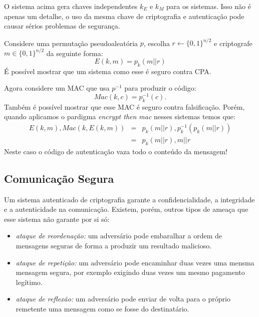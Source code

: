 O sistema acima gera chaves independentes $k_E$ e $k_M$ para os sistemas.
Isso não é apenas um detalhe, o uso da mesma chave de criptografia e autenticação pode causar sérios problemas de segurança.


\begin{example}
  Considere uma permutação pseudoaleatória $p$, escolha $r \leftarrow\{0,1\}^{n/2}$ e criptografe $m \in \{0,1\}^{n/2}$ da seguinte forma:
  \begin{displaymath}
    E(k,m) = p_k(m||r)
  \end{displaymath}
É possível mostrar que um sistema como esse é seguro contra CPA.

Agora considere um MAC que usa $p^{-1}$ para produzir o código:
\begin{displaymath}
  Mac(k,c) = p_k^{-1}(c).
\end{displaymath}
Também é possível mostrar que esse MAC é seguro contra falsificação.
Porém, quando aplicamos o pardigma {\em encrypt then mac} nesses sistemas temos que:
\begin{eqnarray*}
  E(k,m), Mac(k, E(k,m)) & = & p_k(m||r), p_k^{-1}(p_k(m||r))\\
                         & = & p_k(m||r), m||r
\end{eqnarray*}
Neste caso o código de autenticação vaza todo o conteúdo da mensagem!
\end{example}

\subsection{Comunicação Segura}
\label{sec:comunicacao-segura}

Um sistema autenticado de criptografia garante a confidencialidade, a integridade e a autenticidade na comunicação.
Existem, porém, outros tipos de ameaça que esse sistema não garante por si só:
\begin{itemize}
\item {\em ataque de reordenação:} um adversário pode embaralhar a ordem de mensagens seguras de forma a produzir um resultado malicioso.
\item {\em ataque de repetição:} um adversário pode encaminhar duas vezes uma mensma mensagem segura, por exemplo exigindo duas vezes um mesmo pagamento legítimo.
\item {\em ataque de reflexão:} um adversário pode enviar de volta para o próprio remetente uma mensagem como se fosse do destinatário.
\end{itemize}

